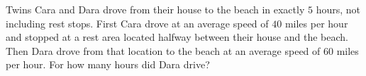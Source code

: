 Twins Cara and Dara drove from their house to the beach in exactly $5$ hours, not including rest stops. First Cara drove at an average speed of $40$ miles per hour and stopped at a rest area located halfway between their house and the beach. Then Dara drove from that location to the beach at an average speed of $60$ miles per hour. For how many hours did Dara drive?
